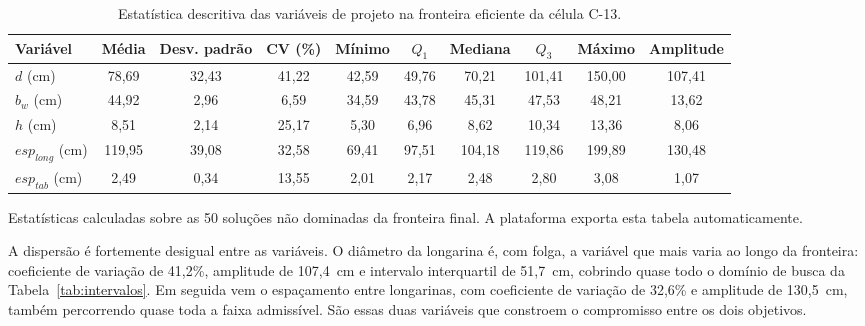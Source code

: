 \begin{table}[!ht]
\caption{Estatística descritiva das variáveis de projeto na fronteira eficiente da célula C-13.\label{tab:estatistica}}
\begin{threeparttable}
\footnotesize
\setlength{\tabcolsep}{3pt}
\begin{tabular*}{\textwidth}{@{\extracolsep{\fill}}lccccccccc@{\extracolsep{\fill}}}
\toprule
Variável & Média & Desv. padrão & CV (\%) & Mínimo & $Q_1$ & Mediana & $Q_3$ & Máximo & Amplitude \\
\midrule
$d$ (cm) & 78{,}69 & 32{,}43 & 41{,}22 & 42{,}59 & 49{,}76 & 70{,}21 & 101{,}41 & 150{,}00 & 107{,}41 \\
$b_w$ (cm) & 44{,}92 & 2{,}96 & 6{,}59 & 34{,}59 & 43{,}78 & 45{,}31 & 47{,}53 & 48{,}21 & 13{,}62 \\
$h$ (cm) & 8{,}51 & 2{,}14 & 25{,}17 & 5{,}30 & 6{,}96 & 8{,}62 & 10{,}34 & 13{,}36 & 8{,}06 \\
$esp_{long}$ (cm) & 119{,}95 & 39{,}08 & 32{,}58 & 69{,}41 & 97{,}51 & 104{,}18 & 119{,}86 & 199{,}89 & 130{,}48 \\
$esp_{tab}$ (cm) & 2{,}49 & 0{,}34 & 13{,}55 & 2{,}01 & 2{,}17 & 2{,}48 & 2{,}80 & 3{,}08 & 1{,}07 \\
\bottomrule
\end{tabular*}
\begin{tablenotes}
\footnotesize
\item Estatísticas calculadas sobre as 50 soluções não dominadas da fronteira final.
A plataforma exporta esta tabela automaticamente.
\end{tablenotes}
\end{threeparttable}
\end{table}

A dispersão é fortemente desigual entre as variáveis.
O diâmetro da longarina é, com folga, a variável que mais varia ao longo da fronteira: coeficiente de variação de 41{,}2\%, amplitude de 107{,}4~cm e intervalo interquartil de 51{,}7~cm, cobrindo quase todo o domínio de busca da Tabela~\ref{tab:intervalos}.
Em seguida vem o espaçamento entre longarinas, com coeficiente de variação de 32{,}6\% e amplitude de 130{,}5~cm, também percorrendo quase toda a faixa admissível.
São essas duas variáveis que constroem o compromisso entre os dois objetivos.

